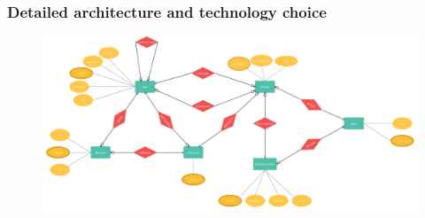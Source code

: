 \documentclass[aspectratio=169]{beamer}
\begin{document}
\begin{frame}
	\frametitle{Detailed architecture and technology choice}
	 \begin{figure}
		\centering
		\includegraphics[width=1\textwidth]{media/entity-relationship-diagram.pdf}
	\end{figure}
\end{frame}
\end{document}

